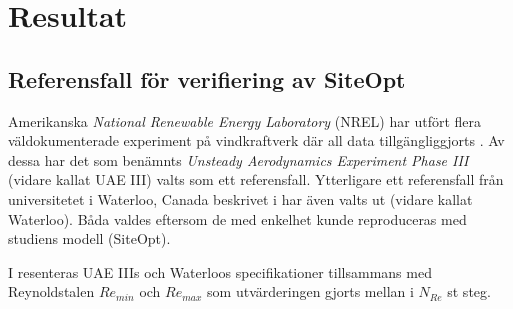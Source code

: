 \chapter{Resultat} \label{Chapter:resultat}

\section{Referensfall för verifiering av SiteOpt}

\label{mattstocksfall}




Amerikanska \emph{National Renewable Energy Laboratory} (NREL) har utfört flera väldokumenterade experiment på vindkraftverk där all data tillgängliggjorts \citep{UAE}. Av dessa har det som benämnts \emph{Unsteady Aerodynamics Experiment Phase III} (vidare kallat UAE III) valts som ett referensfall. Ytterligare ett referensfall från universitetet i Waterloo, Canada beskrivet i \citet{Canada} har även valts ut (vidare kallat Waterloo). Båda valdes eftersom de med enkelhet kunde reproduceras med studiens modell (SiteOpt).

I  resenteras UAE IIIs och Waterloos specifikationer tillsammans med Reynoldstalen $Re_{min}$ och $Re_{max}$ som utvärderingen gjorts mellan i $N_{Re}$ st steg.





\pagebreak

